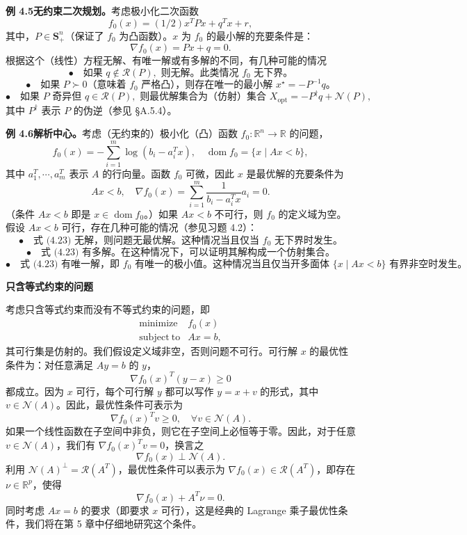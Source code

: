\documentclass[UTF8, 12pt, fontset=fandol, oneside]{ctexart}
\begin{document}
\noindent\textbf{例 4.5\quad 无约束二次规划。}\quad 考虑极小化二次函数
\[
f_0(x)=(1/2)x^TPx+q^Tx+r,
\]
其中，$P\in\mathbf{S}_+^n$（保证了 $f_0$ 为凸函数）。$x$ 为 $f_0$ 的最小解的充要条件是：
\[
\nabla f_0(x)=Px+q=0.
\]
根据这个（线性）方程无解、有唯一解或有多解的不同，有几种可能的情况
\[
\bullet\quad \text{如果 }q\notin\mathcal{R}(P),\text{ 则无解。此类情况 } f_0\text{ 无下界。}
\]
\[
\bullet\quad \text{如果 }P\succ 0\text{（意味着 }f_0\text{ 严格凸），则存在唯一的最小解 }x^\star=-P^{-1}q。
\]
\[
\bullet\quad \text{如果 }P\text{ 奇异但 }q\in\mathcal{R}(P),\text{ 则最优解集合为（仿射）集合 }X_{\mathrm{opt}}=-P^\dagger q+\mathcal{N}(P),
\]
其中 $P^\dagger$ 表示 $P$ 的伪逆（参见 §A.5.4）。

\noindent\textbf{例 4.6\quad 解析中心。}\quad 考虑（无约束的）极小化（凸）函数 $f_0:\mathbb{R}^n\to\mathbb{R}$ 的问题，
\[
f_0(x)=-\sum_{i=1}^{m}\log(b_i-a_i^Tx),\quad \operatorname{dom} f_0=\{x\mid Ax<b\},
\]
其中 $a_1^T,\cdots,a_m^T$ 表示 $A$ 的行向量。函数 $f_0$ 可微，因此 $x$ 是最优解的充要条件为
\begin{equation}
Ax<b,\quad \nabla f_0(x)=\sum_{i=1}^{m}\frac{1}{b_i-a_i^Tx}a_i=0.
\tag{4.23}
\end{equation}
（条件 $Ax<b$ 即是 $x\in\operatorname{dom} f_0$。）如果 $Ax<b$ 不可行，则 $f_0$ 的定义域为空。假设 $Ax<b$ 可行，存在几种可能的情况（参见习题 4.2）：
\[
\bullet\quad \text{式 (4.23) 无解，则问题无最优解。这种情况当且仅当 }f_0\text{ 无下界时发生。}
\]
\[
\bullet\quad \text{式 (4.23) 有多解。在这种情况下，可以证明其解构成一个仿射集合。}
\]
\[
\bullet\quad \text{式 (4.23) 有唯一解，即 }f_0\text{ 有唯一的极小值。这种情况当且仅当开多面体 }\{x\mid Ax<b\}\text{ 有界非空时发生。}
\]

\noindent\textbf{只含等式约束的问题}

考虑只含等式约束而没有不等式约束的问题，即
\[
\begin{array}{ll}
\mathop{\mathrm{minimize}} & f_0(x)\\
\mathrm{subject\ to} & Ax=b,
\end{array}
\]
其可行集是仿射的。我们假设定义域非空，否则问题不可行。可行解 $x$ 的最优性条件为：对任意满足 $Ay=b$ 的 $y$，
\[
\nabla f_0(x)^T(y-x)\geq 0
\]
都成立。因为 $x$ 可行，每个可行解 $y$ 都可以写作 $y=x+v$ 的形式，其中 $v\in\mathcal{N}(A)$。因此，最优性条件可表示为
\[
\nabla f_0(x)^Tv\geq 0,\quad \forall v\in\mathcal{N}(A).
\]
如果一个线性函数在子空间中非负，则它在子空间上必恒等于零。因此，对于任意 $v\in\mathcal{N}(A)$，我们有 $\nabla f_0(x)^Tv=0$，换言之
\[
\nabla f_0(x)\perp \mathcal{N}(A).
\]
利用 $\mathcal{N}(A)^\perp=\mathcal{R}(A^T)$，最优性条件可以表示为 $\nabla f_0(x)\in\mathcal{R}(A^T)$，即存在 $\nu\in\mathbb{R}^p$，使得
\[
\nabla f_0(x)+A^T\nu=0.
\]
同时考虑 $Ax=b$ 的要求（即要求 $x$ 可行），这是经典的 Lagrange 乘子最优性条件，我们将在第 5 章中仔细地研究这个条件。
\end{document}
